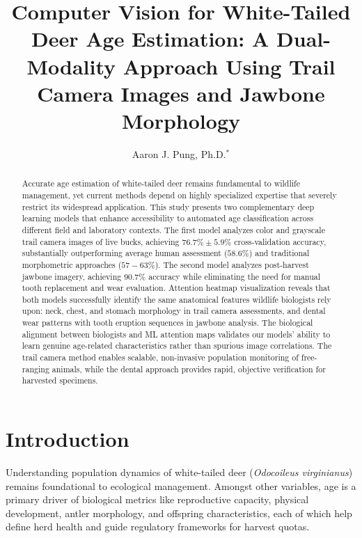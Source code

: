 \documentclass{iopjournal}
\begin{document}

\title{Computer Vision for White-Tailed Deer Age Estimation: A Dual-Modality Approach Using Trail Camera Images and Jawbone Morphology}

\author{Aaron J. Pung, Ph.D.$^{*}$}



\begin{abstract}
Accurate age estimation of white-tailed deer remains fundamental to wildlife management, yet current methods depend on highly specialized expertise that severely restrict its widespread application. This study presents two complementary deep learning models that enhance accessibility to automated age classification across different field and laboratory contexts. The first model analyzes color and grayscale trail camera images of live bucks, achieving $76.7\% \pm 5.9\%$ cross-validation accuracy, substantially outperforming average human assessment ($58.6\%$) and traditional morphometric approaches ($57-63\%$). The second model analyzes post-harvest jawbone imagery, achieving $90.7\%$ accuracy while eliminating the need for manual tooth replacement and wear evaluation. Attention heatmap visualization reveals that both models successfully identify the same anatomical features wildlife biologists rely upon: neck, chest, and stomach morphology in trail camera assessments, and dental wear patterns with tooth eruption sequences in jawbone analysis. The biological alignment between biologists and ML attention maps validates our models' ability to learn genuine age-related characteristics rather than spurious image correlations. The trail camera method enables scalable, non-invasive population monitoring of free-ranging animals, while the dental approach provides rapid, objective verification for harvested specimens.
\end{abstract}

\section{Introduction}
Understanding population dynamics of white-tailed deer (\textit{Odocoileus virginianus}) remains foundational to ecological management. Amongst other variables, age is a primary driver of biological metrics like reproductive capacity, physical development, antler morphology, and offspring characteristics, each of which help define herd health and guide regulatory frameworks for harvest quotas.
\end{document}
